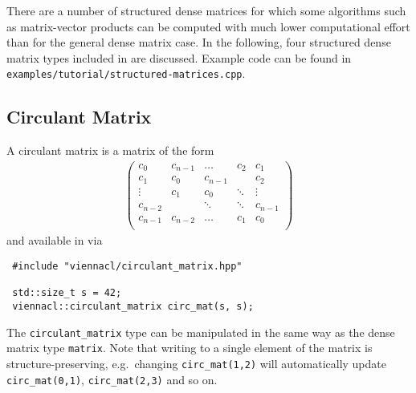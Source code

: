 
There are a number of structured dense matrices for which some algorithms such as matrix-vector products can be computed with much lower computational effort
than for the general dense matrix case. In the following, four structured dense matrix types included in {\ViennaCL} are discussed. 
Example code can be found in \lstinline|examples/tutorial/structured-matrices.cpp|.

\subsection{Circulant Matrix}
A circulant matrix is a matrix of the form
\begin{align*}
 \left( \begin{array}{ccccc}
         c_0 & c_{n-1} & \ldots & c_2 & c_1 \\
         c_1 & c_0 & c_{n-1} & & c_2 \\
         \vdots & c_1 & c_0 & \ddots & \vdots \\
         c_{n-2} & & \ddots & \ddots & c_{n-1} \\
         c_{n-1} & c_{n-2} & \hdots & c_1 & c_0 \\
        \end{array} \right)
\end{align*}
and available in {\ViennaCL} via
\begin{lstlisting}
 #include "viennacl/circulant_matrix.hpp"

 std::size_t s = 42;
 viennacl::circulant_matrix circ_mat(s, s);
\end{lstlisting}
The \lstinline|circulant_matrix| type can be manipulated in the same way as the dense matrix type \lstinline|matrix|. Note that writing to a single element of
the matrix is structure-preserving, e.g.~changing \lstinline|circ_mat(1,2)| will automatically update \lstinline|circ_mat(0,1)|, \lstinline|circ_mat(2,3)| and
so on.


